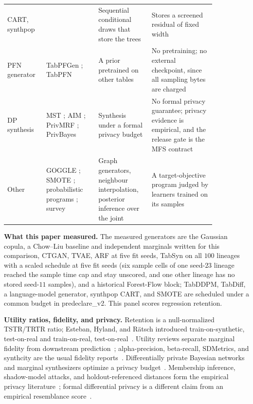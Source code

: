 \documentclass{article}
\begin{document}
\begin{table}[t]
\begin{tabular}{@{}>{\raggedright\arraybackslash}p{0.14\linewidth}>{\raggedright\arraybackslash}p{0.22\linewidth}>{\raggedright\arraybackslash}p{0.22\linewidth}>{\raggedright\arraybackslash}p{0.27\linewidth}@{}}
CART, synthpop & \citet{nowok2016synthpop} & Sequential conditional draws that store the trees & Stores a screened residual of fixed width \\
PFN generator & TabPFGen \citep{ma2023tabpfgen}; TabPFN \citep{hollmann2025tabpfn} & A prior pretrained on other tables & No pretraining; no external checkpoint, since all sampling bytes are charged \\
DP synthesis & MST \citep{mckenna2021mst}; AIM \citep{mckenna2022aim}; PrivMRF \citep{cai2021privmrf}; PrivBayes \citep{zhang2014privbayes} & Synthesis under a formal privacy budget & No formal privacy guarantee; privacy evidence is empirical, and the release gate is the MFS contract \\
Other & GOGGLE \citep{liu2023goggle}; SMOTE \citep{chawla2002smote}; probabilistic programs \citep{saad2019bayesian,mansinghka2016crosscat}; survey \citep{borisov2024survey} & Graph generators, neighbour interpolation, posterior inference over the joint & A target-objective program judged by learners trained on its samples \\
\bottomrule
\end{tabular}
\end{table}

\textbf{What this paper measured.} The measured generators are the Gaussian copula, a Chow--Liu baseline and independent marginals written for this comparison, CTGAN, TVAE, ARF at five fit seeds, TabSyn on all $100$ lineages with a scaled schedule at five fit seeds (six sample cells of one seed-$23$ lineage reached the sample time cap and stay unscored, and one other lineage has no stored seed-$11$ samples), and a historical Forest-Flow block; TabDDPM, TabDiff, a language-model generator, synthpop CART, and SMOTE are scheduled under a common budget in predeclare\_v2. This panel scores regression retention.

\textbf{Utility ratios, fidelity, and privacy.} Retention is a null-normalized TSTR/TRTR ratio; Esteban, Hyland, and R{\"a}tsch introduced train-on-synthetic, test-on-real and train-on-real, test-on-real~\citep{esteban2017rcgan}. Utility reviews separate marginal fidelity from downstream prediction~\citep{snoke2018utility,raab2018practical}; alpha-precision, beta-recall, SDMetrics, and synthcity are the usual fidelity reports~\citep{alaa2022faithful,zhang2020sdmetrics,qian2023synthcity}. Differentially private Bayesian networks and marginal synthesizers optimize a privacy budget~\citep{zhang2014privbayes,mckenna2021mst,mckenna2022aim,cai2021privmrf}. Membership inference, shadow-model attacks, and holdout-referenced distances form the empirical privacy literature~\citep{shokri2017membership,hayes2018logan,vanbreugel2023domias,stadler2022groundhog,platzer2021holdout}; formal differential privacy is a different claim from an empirical resemblance score~\citep{dwork2014foundations,abadi2016deep}.
\end{document}
